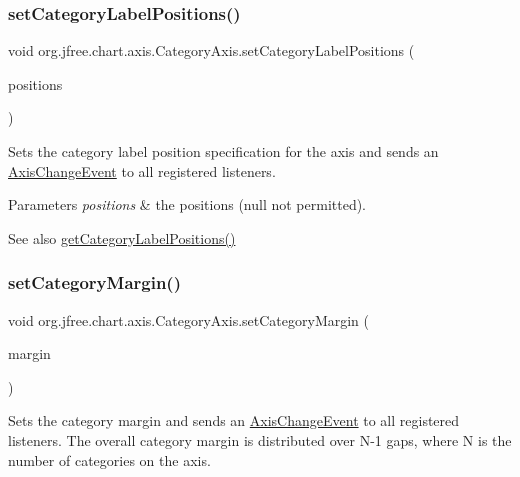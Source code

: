 \subsubsection{\texorpdfstring{set\+Category\+Label\+Positions()}{setCategoryLabelPositions()}}
{\footnotesize\ttfamily void org.\+jfree.\+chart.\+axis.\+Category\+Axis.\+set\+Category\+Label\+Positions (\begin{DoxyParamCaption}\item[{\mbox{\hyperlink{classorg_1_1jfree_1_1chart_1_1axis_1_1_category_label_positions}{Category\+Label\+Positions}}}]{positions }\end{DoxyParamCaption})}

Sets the category label position specification for the axis and sends an \mbox{\hyperlink{}{Axis\+Change\+Event}} to all registered listeners.


\begin{DoxyParams}{Parameters}
{\em positions} & the positions ({\ttfamily null} not permitted).\\
\hline
\end{DoxyParams}
\begin{DoxySeeAlso}{See also}
\mbox{\hyperlink{classorg_1_1jfree_1_1chart_1_1axis_1_1_category_axis_af6b7cf3f093f1d0e86f39e37ceed7231}{get\+Category\+Label\+Positions()}} 
\end{DoxySeeAlso}
\mbox{\label{classorg_1_1jfree_1_1chart_1_1axis_1_1_category_axis_ae0b9ff86039cece69e084ba53823f7d7}} 
\subsubsection{\texorpdfstring{set\+Category\+Margin()}{setCategoryMargin()}}
{\footnotesize\ttfamily void org.\+jfree.\+chart.\+axis.\+Category\+Axis.\+set\+Category\+Margin (\begin{DoxyParamCaption}\item[{double}]{margin }\end{DoxyParamCaption})}

Sets the category margin and sends an \mbox{\hyperlink{}{Axis\+Change\+Event}} to all registered listeners. The overall category margin is distributed over N-\/1 gaps, where N is the number of categories on the axis.


